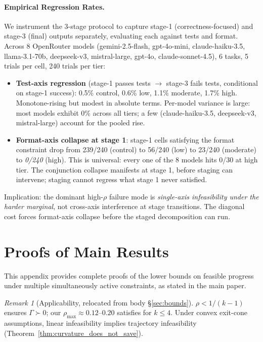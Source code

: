\documentclass{article}
\theoremstyle{plain}
\theoremstyle{definition}
\theoremstyle{remark}
\newtheorem{remark}[theorem]{Remark}
\begin{document}
\paragraph{Empirical Regression Rates.}
We instrument the 3-stage protocol to capture stage-1 (correctness-focused) and stage-3 (final) outputs separately, evaluating each against tests and format. Across 8 OpenRouter models (gemini-2.5-flash, gpt-4o-mini, claude-haiku-3.5, llama-3.1-70b, deepseek-v3, mistral-large, gpt-4o, claude-sonnet-4.5), 6 tasks, 5 trials per cell, 240 trials per tier:
\begin{itemize}[nosep]
\item \textbf{Test-axis regression} (stage-1 passes tests $\to$ stage-3 fails tests, conditional on stage-1 success): 0.5\% control, 0.6\% low, 1.1\% moderate, 1.7\% high. Monotone-rising but modest in absolute terms. Per-model variance is large: most models exhibit 0\% across all tiers; a few (claude-haiku-3.5, deepseek-v3, mistral-large) account for the pooled rise.
\item \textbf{Format-axis collapse at stage 1}: stage-1 cells satisfying the format constraint drop from 239/240 (control) to 56/240 (low) to 23/240 (moderate) to \emph{0/240} (high). This is universal: every one of the 8 models hits 0/30 at high tier. The conjunction collapse manifests at stage 1, before staging can intervene; staging cannot regress what stage 1 never satisfied.
\end{itemize}
Implication: the dominant high-$\rho$ failure mode is \emph{single-axis infeasibility under the harder marginal}, not cross-axis interference at stage transitions. The diagonal cost forces format-axis collapse before the staged decomposition can run.

\section{Proofs of Main Results}\label{app:proofs}\hypertarget{lim:enforced}{}

This appendix provides complete proofs of the lower bounds on feasible progress under
multiple simultaneously active constraints, as stated in the main paper.

\begin{remark}[Applicability, relocated from body \S\ref{sec:bounds}]\label{rem:applicability}
$\rho < 1/(k{-}1)$ ensures $\Gamma \succ 0$; our $\rho_{\max} \approx 0.12$--$0.20$ satisfies for $k \le 4$. Under convex exit-cone assumptions, linear infeasibility implies trajectory infeasibility (Theorem~\ref{thm:curvature_does_not_save}).
\end{remark}
\end{document}
